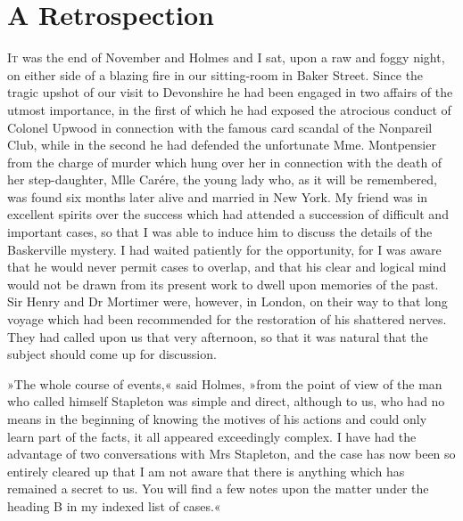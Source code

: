 \chapter{A Retrospection}

\lettrine[lines=4]{I}{t} was the end of November and Holmes and I sat, upon a raw and foggy night, on either side of a blazing fire in our sitting-room in Baker Street. Since the tragic upshot of our visit to Devonshire he had been engaged in two affairs of the utmost importance, in the first of which he had exposed the atrocious conduct of Colonel Upwood in connection with the famous card scandal of the Nonpareil Club, while in the second he had defended the unfortunate Mme. Montpensier from the charge of murder which hung over her in connection with the death of her step-daughter, Mlle Carére, the young lady who, as it will be re\-mem\-bered, was found six months later alive and married in New York. My friend was in excellent spirits over the success which had attended a succession of difficult and important cases, so that I was able to induce him to discuss the details of the Baskerville mystery. I had waited patiently for the opportunity, for I was aware that he would never permit cases to overlap, and that his clear and logical mind would not be drawn from its present work to dwell upon memories of the past. Sir Henry and Dr Mortimer were, however, in London, on their way to that long voyage which had been recommended for the restoration of his shattered nerves. They had called upon us that very afternoon, so that it was natural that the subject should come up for discussion.



»The whole course of events,« said Holmes, »from the point of view of the man who called himself Stapleton was simple and direct, although to us, who had no means in the beginning of knowing the motives of his actions and could only learn part of the facts, it all appeared exceedingly complex. I have had the advantage of two conversations with Mrs Stapleton, and the case has now been so entirely cleared up that I am not aware that there is anything which has remained a secret to us. You will find a few notes upon the matter under the heading B in my indexed list of cases.«

